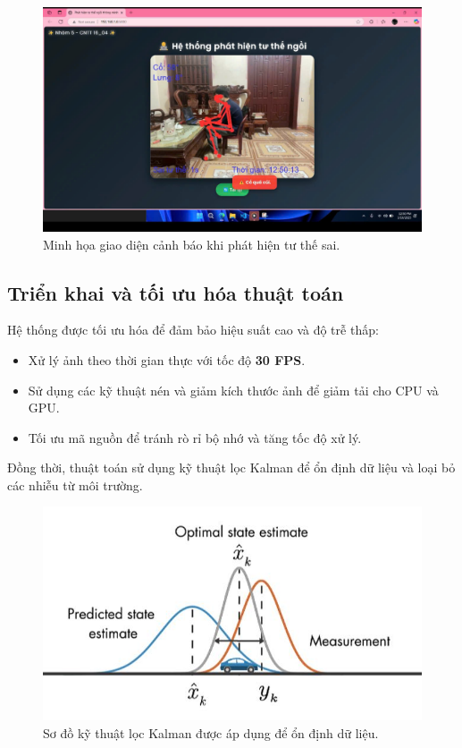 \documentclass[journal,onecolumn]{IEEEtran}
\begin{document}
\begin{figure}[H]
    \centering
    \includegraphics[width=0.7\linewidth]{images/warning_display.png}
    \caption{Minh họa giao diện cảnh báo khi phát hiện tư thế sai.}
    \label{fig:warning_display}
\end{figure}

\subsection{\textbf{Triển khai và tối ưu hóa thuật toán}}
Hệ thống được tối ưu hóa để đảm bảo hiệu suất cao và độ trễ thấp:
\begin{itemize}
    \item Xử lý ảnh theo thời gian thực với tốc độ \textbf{30 FPS}.
    \item Sử dụng các kỹ thuật nén và giảm kích thước ảnh để giảm tải cho CPU và GPU.
    \item Tối ưu mã nguồn để tránh rò rỉ bộ nhớ và tăng tốc độ xử lý.
\end{itemize}

Đồng thời, thuật toán sử dụng kỹ thuật lọc Kalman để ổn định dữ liệu và loại bỏ các nhiễu từ môi trường.

\begin{figure}[H]
    \centering
    \includegraphics[width=0.7\linewidth]{images/kalman_filter.png}
    \caption{Sơ đồ kỹ thuật lọc Kalman được áp dụng để ổn định dữ liệu.}
    \label{fig:kalman_filter}
\end{figure}
\end{document}
